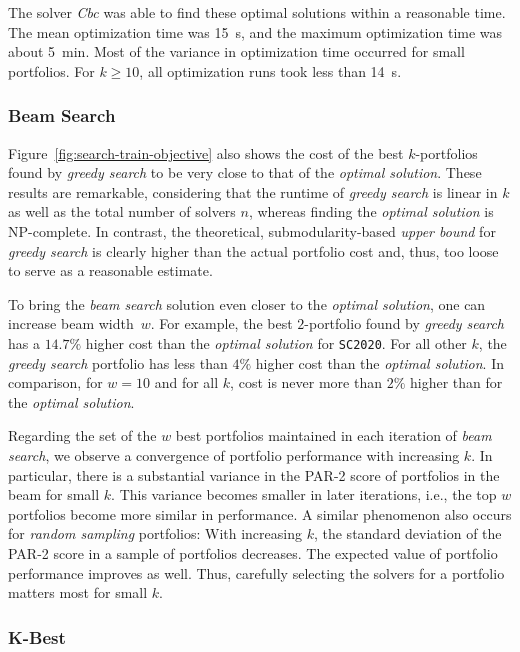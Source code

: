 \documentclass[a4paper,USenglish,pdfa]{lipics-v2021} %
\begin{document}
The solver \emph{Cbc} was able to find these optimal solutions within a reasonable time.
The mean optimization time was 15~s, and the maximum optimization time was about 5~min.
Most of the variance in optimization time occurred for small portfolios.
For $k \geq 10$, all optimization runs took less than 14~s.

\subsubsection{Beam Search}

Figure~\ref{fig:search-train-objective} also shows the cost of the best $k$-portfolios found by \emph{greedy search} to be very close to that of the \emph{optimal solution}.
These results are remarkable, considering that the runtime of \emph{greedy search} is linear in $k$ as well as the total number of solvers $n$, whereas finding the \emph{optimal solution} is NP-complete.
In contrast, the theoretical, submodularity-based \emph{upper bound} for \emph{greedy search} is clearly higher than the actual portfolio cost and, thus, too loose to serve as a reasonable estimate.

To bring the \emph{beam search} solution even closer to the \emph{optimal solution}, one can increase beam width~$w$.
For example, the best $2$-portfolio found by \emph{greedy search} has a $14.7\%$ higher cost than the \emph{optimal solution} for \texttt{SC2020}.
For all other $k$, the \emph{greedy search} portfolio has less than $4\%$ higher cost than the \emph{optimal solution}.
In comparison, for $w=10$ and for all $k$, cost is never more than $2\%$ higher than for the \emph{optimal solution}.

Regarding the set of the $w$ best portfolios maintained in each iteration of \emph{beam search}, we observe a convergence of portfolio performance with increasing $k$. 
In particular, there is a substantial variance in the PAR-2 score of portfolios in the beam for small $k$.
This variance becomes smaller in later iterations, i.e., the top $w$ portfolios become more similar in performance.
A similar phenomenon also occurs for \emph{random sampling} portfolios:
With increasing $k$, the standard deviation of the PAR-2 score in a sample of portfolios decreases.
The expected value of portfolio performance improves as well.
Thus, carefully selecting the solvers for a portfolio matters most for small $k$.

\subsubsection{K-Best}
\end{document}
